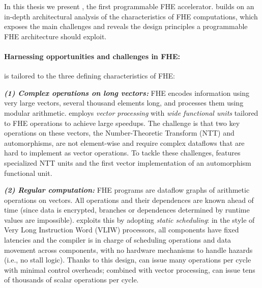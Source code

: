 In this thesis we present \name, the first programmable FHE accelerator.
\name builds on an in-depth architectural analysis of the characteristics of FHE computations, which exposes the main challenges and reveals the design principles a programmable FHE architecture should exploit.


\paragraph{Harnessing opportunities and challenges in FHE:}
\name is tailored to the three defining characteristics of FHE:

\noindent \textbf{\emph{(1) Complex operations on long vectors:}}
FHE encodes information using very large vectors, several thousand elements long,
and processes them using modular arithmetic.
%
\name employs \emph{vector processing} with \emph{wide functional units} tailored to FHE operations
to achieve large speedups.
The challenge is that two key operations on these vectors, the Number-Theoretic Transform (NTT) and automorphisms, are not element-wise and require complex dataflows that are hard to implement as vector operations. 
To tackle these challenges, \name features specialized NTT units and the first vector implementation of an automorphism functional unit.

\noindent \textbf{\emph{(2) Regular computation:}}
FHE programs are dataflow graphs of arithmetic operations on vectors.
All operations and their dependences are known ahead of time (since data is encrypted, branches
or dependences determined by runtime values are impossible).
%
\name exploits this by adopting \emph{static scheduling}:
in the style of Very Long Instruction Word (VLIW) processors,
all components have fixed latencies and the compiler is in charge of scheduling
operations and data movement across components, with no hardware mechanisms to handle hazards (i.e., no stall logic).
Thanks to this design, \name can issue many operations per cycle with minimal control overheads;
combined with vector processing, \name can issue tens of thousands of scalar operations per cycle. %

